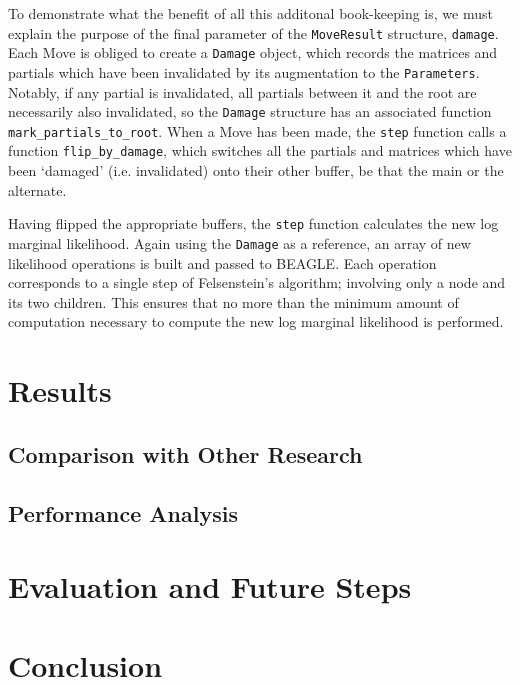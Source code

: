 \documentclass[10pt,journal,compsoc]{IEEEtran}
\begin{document}
To demonstrate what the benefit of all this additonal book-keeping is, we must explain the purpose of the final parameter of the \texttt{MoveResult} structure, \texttt{damage}. Each Move is obliged to create a \texttt{Damage} object, which records the matrices and partials which have been invalidated by its augmentation to the \texttt{Parameters}. Notably, if any partial is invalidated, all partials between it and the root are necessarily also invalidated, so the \texttt{Damage} structure has an associated function \texttt{mark\_partials\_to\_root}. When a Move has been made, the \texttt{step} function calls a function \texttt{flip\_by\_damage}, which switches all the partials and matrices which have been `damaged' (i.e. invalidated) onto their other buffer, be that the main or the alternate.

Having flipped the appropriate buffers, the \texttt{step} function calculates the new log marginal likelihood. Again using the \texttt{Damage} as a reference, an array of new likelihood operations is built and passed to BEAGLE. Each operation corresponds to a single step of Felsenstein's algorithm; involving only a node and its two children. This ensures that no more than the minimum amount of computation necessary to compute the new log marginal likelihood is performed.

\section{Results}

\subsection{Comparison with Other Research}

\subsection{Performance Analysis}

\section{Evaluation and Future Steps}

\section{Conclusion}

\newpage



\end{document}
